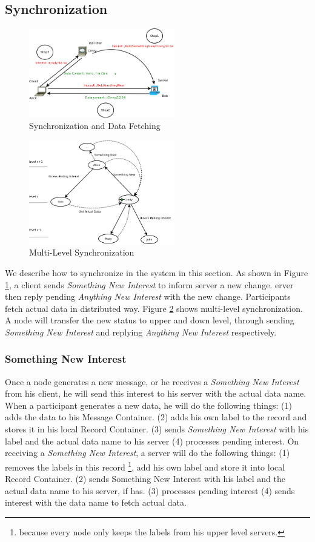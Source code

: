 \documentclass[conference]{IEEEtran}
\begin{document}
\subsection{Synchronization}
\begin{figure}[!t]
\centering
\includegraphics[width=2.5in]{../png/synchronization.png}
\caption{Synchronization and Data Fetching}
\label{synchronization}
\end{figure}
\begin{figure}[!t]
\centering
\includegraphics[width=2.5in]{../png/tree-synchronization.png}
\caption{Multi-Level Synchronization}
\label{tree_synchronization}
\end{figure}
We describe how to synchronize in the system in this section.
As shown in Figure \ref{synchronization}, a client sends \emph{Something New Interest} to inform server a new change.
erver then reply pending \emph{Anything New Interest} with the new change.
Participants fetch actual data in distributed way.
Figure \ref{tree_synchronization} shows multi-level synchronization.
A node will transfer the new status to upper and down level,
through sending \emph{Something New Interest} and replying \emph{Anything New Interest} respectively.

\subsubsection{Something New Interest}
Once a node generates a new message, or he receives a \emph{Something New Interest} from his client,
he will send this interest to his server with the actual data name.
When a participant generates a new data, he will do the following things:
(1) adds the data to his Message Container.
(2) adds his own label to the record and stores it in his local Record Container.
(3) sends \emph{Something New Interest} with his label and the actual data name to his server
(4) processes pending interest.
On receiving a \emph{Something New Interest}, a server  will do the following things:
(1) removes the labels in this record
\footnote{because every node only keeps the labels from his upper level servers.},
add his own label and store it into local Record Container.
(2) sends Something New Interest with his label and the actual data name to his server, if has.
(3) processes pending interest
(4) sends interest with the data name to fetch actual data.
\end{document}
